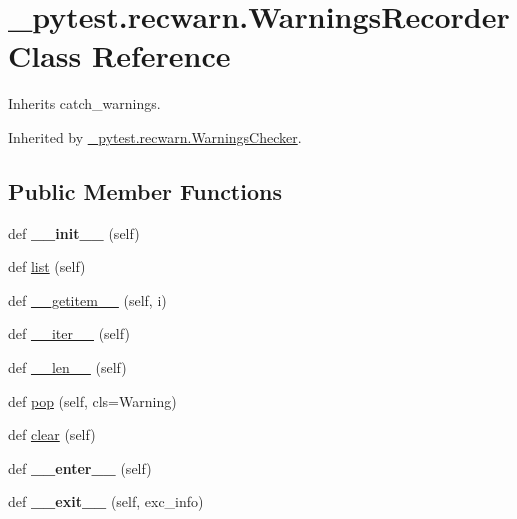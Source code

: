 \hypertarget{class__pytest_1_1recwarn_1_1_warnings_recorder}{}\section{\+\_\+pytest.\+recwarn.\+Warnings\+Recorder Class Reference}
\label{class__pytest_1_1recwarn_1_1_warnings_recorder}


Inherits catch\+\_\+warnings.



Inherited by \hyperlink{class__pytest_1_1recwarn_1_1_warnings_checker}{\+\_\+pytest.\+recwarn.\+Warnings\+Checker}.

\subsection*{Public Member Functions}
\begin{DoxyCompactItemize}
\item 
\mbox{\label{class__pytest_1_1recwarn_1_1_warnings_recorder_a6298abdd268aacdfa57ae3a5c4e94c26}} 
def {\bfseries \+\_\+\+\_\+init\+\_\+\+\_\+} (self)
\item 
def \hyperlink{class__pytest_1_1recwarn_1_1_warnings_recorder_a8cf30d19a6cdb33f515acf608735f71b}{list} (self)
\item 
def \hyperlink{class__pytest_1_1recwarn_1_1_warnings_recorder_a5c3b828c65d948db1b525cdfdaa62d1f}{\+\_\+\+\_\+getitem\+\_\+\+\_\+} (self, i)
\item 
def \hyperlink{class__pytest_1_1recwarn_1_1_warnings_recorder_aeb8a121aa32a98c792c1a38a59862f80}{\+\_\+\+\_\+iter\+\_\+\+\_\+} (self)
\item 
def \hyperlink{class__pytest_1_1recwarn_1_1_warnings_recorder_a0fc8ac5c8aab697ebd34a0efd255ae66}{\+\_\+\+\_\+len\+\_\+\+\_\+} (self)
\item 
def \hyperlink{class__pytest_1_1recwarn_1_1_warnings_recorder_ad217d042063980c4c7893e27f082a5d2}{pop} (self, cls=Warning)
\item 
def \hyperlink{class__pytest_1_1recwarn_1_1_warnings_recorder_a9494a4fc99b851ac383a78589b89abde}{clear} (self)
\item 
\mbox{\label{class__pytest_1_1recwarn_1_1_warnings_recorder_ab8e007efceedeba563e5714802adc5d4}} 
def {\bfseries \+\_\+\+\_\+enter\+\_\+\+\_\+} (self)
\item 
\mbox{\label{class__pytest_1_1recwarn_1_1_warnings_recorder_a746d04275bace23bc94c4f7e1ee28d2b}} 
def {\bfseries \+\_\+\+\_\+exit\+\_\+\+\_\+} (self, exc\+\_\+info)
\end{DoxyCompactItemize}


